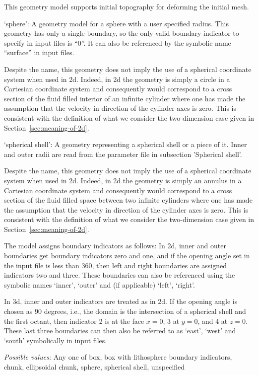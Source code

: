 \begin{itemize}
This geometry model supports initial topography for deforming the initial mesh.

`sphere': A geometry model for a sphere with a user specified radius. This geometry has only a single boundary, so the only valid boundary indicator to specify in input files is ``0''. It can also be referenced by the symbolic name ``surface'' in input files.

Despite the name, this geometry does not imply the use of a spherical coordinate system when used in 2d. Indeed, in 2d the geometry is simply a circle in a Cartesian coordinate system and consequently would correspond to a cross section of the fluid filled interior of an infinite cylinder where one has made the assumption that the velocity in direction of the cylinder axes is zero. This is consistent with the definition of what we consider the two-dimension case given in Section~\ref{sec:meaning-of-2d}.

`spherical shell': A geometry representing a spherical shell or a piece of it. Inner and outer radii are read from the parameter file in subsection 'Spherical shell'.

Despite the name, this geometry does not imply the use of a spherical coordinate system when used in 2d. Indeed, in 2d the geometry is simply an annulus in a Cartesian coordinate system and consequently would correspond to a cross section of the fluid filled space between two infinite cylinders where one has made the assumption that the velocity in direction of the cylinder axes is zero. This is consistent with the definition of what we consider the two-dimension case given in Section~\ref{sec:meaning-of-2d}.

The model assigns boundary indicators as follows: In 2d, inner and outer boundaries get boundary indicators zero and one, and if the opening angle set in the input file is less than 360, then left and right boundaries are assigned indicators two and three. These boundaries can also be referenced using the symbolic names `inner', `outer' and (if applicable) `left', `right'.

In 3d, inner and outer indicators are treated as in 2d. If the opening angle is chosen as 90 degrees, i.e., the domain is the intersection of a spherical shell and the first octant, then indicator 2 is at the face $x=0$, 3 at $y=0$, and 4 at $z=0$. These last three boundaries can then also be referred to as `east', `west' and `south' symbolically in input files.


{\it Possible values:} Any one of box, box with lithosphere boundary indicators, chunk, ellipsoidal chunk, sphere, spherical shell, unspecified
\end{itemize}



